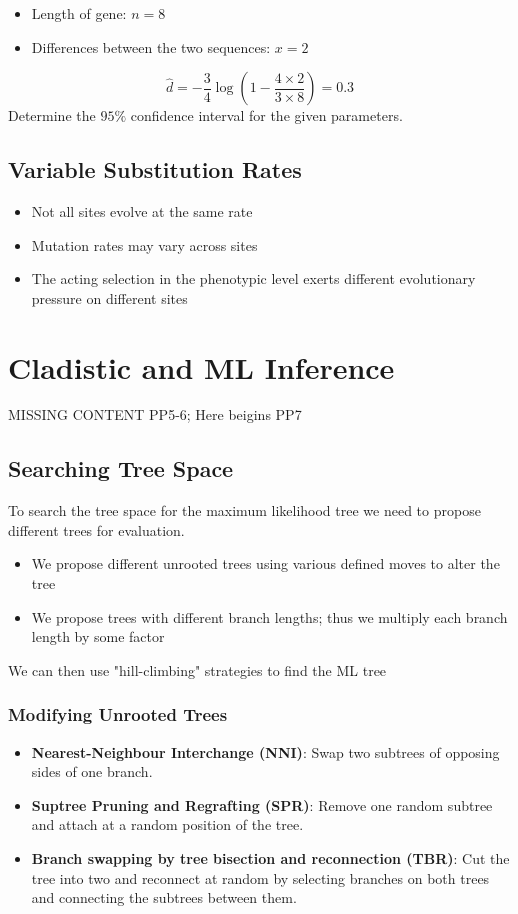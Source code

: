 \documentclass{article}
\begin{document}
\begin{multicols*}{3}
\begin{itemize}
    \item Length of gene: $n = 8$
    \item Differences between the two sequences: $x = 2$
\end{itemize}

$$\hat{d} = -\frac{3}{4}\log\left(1-\frac{4\times 2}{3\times 8}\right) = 0.3$$
Determine the $95 \%$ confidence interval for the given parameters. 

\subsection{Variable Substitution Rates}

\begin{itemize}
    \item Not all sites evolve at the same rate
    \item Mutation rates may vary across sites \item The acting selection in the phenotypic level exerts different evolutionary pressure on different sites
\end{itemize}

\section{Cladistic and ML Inference}
{\color{red} MISSING CONTENT PP5-6; Here beigins PP7}

\subsection{Searching Tree Space}
To search the tree space for the maximum likelihood tree we need to propose different trees for evaluation. 
\begin{itemize}
    \item We propose different unrooted trees using various defined moves to alter the tree
    \item We propose trees with different branch lengths; thus we multiply each branch length by some factor
\end{itemize}
\textrightarrow We can then use "hill-climbing" strategies to find the ML tree

\subsubsection{Modifying Unrooted Trees}

\begin{itemize}
    \item \textbf{Nearest-Neighbour Interchange (NNI)}: Swap two subtrees of opposing sides of one branch. 
    \item \textbf{Suptree Pruning and Regrafting (SPR)}: Remove one random subtree and attach at a random position of the tree.
    \item \textbf{Branch swapping by tree bisection and reconnection (TBR)}: Cut the tree into two and reconnect at random by selecting branches on both trees and connecting the subtrees between them. 
\end{itemize}


\end{multicols*}
\end{document}
